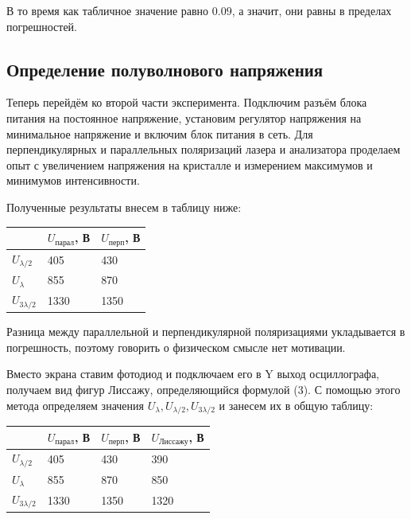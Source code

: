 \documentclass[a4paper,12pt]{extarticle}
\begin{document}
В то время как табличное значение равно $0.09$, а значит, они равны в пределах погрешностей.

\subsection*{Определение полуволнового напряжения}
Теперь перейдём ко второй части эксперимента.
Подключим разъём блока питания на постоянное напряжение, установим
регулятор напряжения на минимальное напряжение и включим блок питания в сеть.
Для перпендикулярных и параллельных поляризаций лазера и анализатора проделаем опыт с увеличением напряжения на кристалле и измерением максимумов и минимумов интенсивности.

Полученные результаты
внесем в таблицу ниже:
\begin{table}[H]
\centering
\begin{tabular}{|l|l|l|}
\hline
  & $U_{\text{парал}}$, В & $U_{\text{перп}}$, В \\ \hline
$U_{\lambda/2}$  & 405                     & 430                  \\ \hline
$U_{\lambda}$    & 855                     & 870                  \\ \hline
$U_{3\lambda/2}$ & 1330                  & 1350                \\ \hline
\end{tabular}
\end{table}
Разница между параллельной и перпендикулярной поляризациями укладывается в погрешность, поэтому говорить о физическом смысле нет мотивации.

Вместо экрана ставим фотодиод и подключаем его в Y выход осциллографа, получаем вид фигур Лиссажу, определяющийся формулой (3). С помощью этого метода определяем значения $U_{\lambda}, U_{\lambda/2}, U_{3\lambda/2}$ и занесем их в общую таблицу: 
\begin{table}[H]
\centering
\begin{tabular}{|l|l|l|l|}
\hline
  & $U_{\text{парал}}$, В & $U_{\text{перп}}$, В & $U_{\text{Лиссажу}}$, В\\ \hline
$U_{\lambda/2}$  & 405                     & 430        & 390          \\ \hline
$U_{\lambda}$    & 855                     & 870        & 850          \\ \hline
$U_{3\lambda/2}$ & 1330                  & 1350         & 1320       \\ \hline
\end{tabular}
\end{table}
\end{document}
